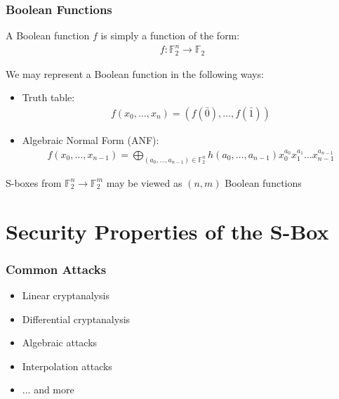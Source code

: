 \documentclass[10pt]{beamer}
\begin{document}
\begin{frame}
	\frametitle{Boolean Functions}
	A Boolean function $f$ is simply a function of the form:
	\begin{align*}
		f : \mathbb{F}_2^n \to \mathbb{F}_2
	\end{align*}

	\medskip
	\pause

	We may represent a Boolean function in the following ways:
	\begin{itemize}
		\item Truth table: 
		\begin{align*}
			f(x_0,\dots,x_n) = (f(\bar{0}), \dots, f(\bar{1}))
		\end{align*}
		\item Algebraic Normal Form (ANF): 
		\begin{align*}
			f(x_0,\dots,x_{n-1}) = \bigoplus_{(a_0,\dots,a_{n-1}) \in \mathbb{F}_2^n} h(a_0,\dots,a_{n-1})x_0^{a_0}x_1^{a_1}\dots x_{n-1}^{a_{n-1}}
		\end{align*}
	\end{itemize}

	\medskip
	\pause
	S-boxes from $\mathbb{F}_2^n \to \mathbb{F}_2^m$ may be viewed as $(n,m)$ Boolean functions
\end{frame}




\section{Security Properties of the S-Box}
\begin{frame}
	\frametitle{Common Attacks}
	\begin{itemize}
		\item Linear cryptanalysis
		\item Differential cryptanalysis
		\item Algebraic attacks
		\item Interpolation attacks
		\item ... and more
	\end{itemize}
\end{frame}
\end{document}
